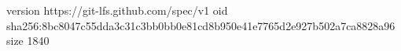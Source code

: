 version https://git-lfs.github.com/spec/v1
oid sha256:8bc8047c55dda3c31c3bb0bb0e81cd8b950e41e7765d2e927b502a7ca8828a96
size 1840
